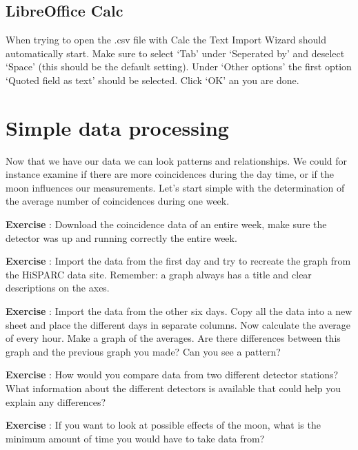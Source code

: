 \documentclass[12pt,a4paper]{article}
\numberwithin{equation}{section}
\numberwithin{figure}{section}
\newcounter{Exercise}
\numberwithin{table}{section}
\begin{document}
\subsection{LibreOffice Calc}
When trying to open the .csv file with Calc the Text Import Wizard should automatically start. Make sure to select `Tab' under `Seperated by' and deselect `Space' (this should be the default setting). Under `Other options' the first option `Quoted field as text' should be selected. Click `OK' an you are done.

\section{Simple data processing}
Now that we have our data we can look patterns and relationships. We could for instance examine if there are more coincidences during the day time, or if the moon influences our measurements. Let's start simple with the determination of the average number of coincidences during one week.

\begin{shaded}
\textbf{Exercise \theExercise {}} : Download the coincidence data of an entire week, make sure the detector was up and running correctly the entire week.\end{shaded}
\begin{shaded}
\textbf{Exercise \theExercise {}} : Import the data from the first day and try to recreate the graph from the HiSPARC data site. Remember: a graph always has a title and clear descriptions on the axes.\end{shaded}
\begin{shaded}
\textbf{Exercise \theExercise {}} : Import the data from the other six days. Copy all the data into a new sheet and place the different days in separate columns. Now calculate the average of every hour. Make a graph of the averages. Are there differences between this graph and the previous graph you made? Can you see a pattern?\end{shaded}
\begin{shaded}
\textbf{Exercise \theExercise {}} : How would you compare data from two different detector stations? What information about the different detectors is available that could help you explain any differences?\end{shaded}
\begin{shaded}
\textbf{Exercise \theExercise {}} : If you want to look at possible effects of the moon, what is the minimum amount of time you would have to take data from?\end{shaded}
\end{document}
